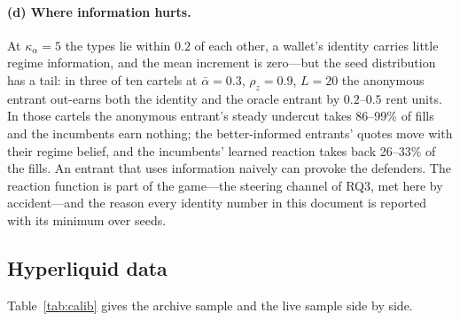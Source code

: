 \documentclass[11pt]{article}
\begin{document}
\begin{table}[h]\footnotesize\centering
{}
\caption{Entrant profit in rent units under the regime model with mark lag $L$ ($\kappa_\alpha=1$, $\rho=0$, break-even quote rule, ten seeds).}\label{tab:lag}
\end{table}

\paragraph{(d) Where information hurts.} At $\kappa_\alpha=5$ the types lie within $0.2$ of each other, a wallet's identity carries little regime information, and the mean increment is zero---but the seed distribution has a tail: in three of ten cartels at $\bar\alpha=0.3$, $\rho_z=0.9$, $L=20$ the anonymous entrant out-earns both the identity and the oracle entrant by $0.2$--$0.5$ rent units. In those cartels the anonymous entrant's steady undercut takes 86--99\% of fills and the incumbents earn nothing; the better-informed entrants' quotes move with their regime belief, and the incumbents' learned reaction takes back 26--33\% of the fills. An entrant that uses information naively can provoke the defenders. The reaction function is part of the game---the steering channel of RQ3, met here by accident---and the reason every identity number in this document is reported with its minimum over seeds.

\subsection{Hyperliquid data}\label{sec:data}
Table~\ref{tab:calib} gives the archive sample and the live sample side by side.
\end{document}
